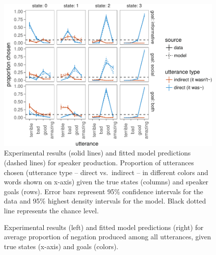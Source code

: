 \documentclass[12pt]{article}
\begin{document}
\begin{figure}
\centering
\includegraphics{fig/utterancePrediction-1.pdf}
\caption{\label{fig:utterancePrediction}Experimental results (solid lines) and fitted model predictions (dashed lines) for speaker production.
Proportion of utterances chosen (utterance type -- direct vs.~indirect -- in different colors and words shown on x-axis) given the true states (columns) and speaker goals (rows). Error bars represent 95\% confidence intervals for the data and 95\% highest density intervals for the model.
Black dotted line represents the chance level.}
\end{figure}

\begin{figure}
\centering
\caption{\label{fig:negationPrediction}Experimental results (left) and fitted model predictions (right) for average proportion of negation produced among all utterances, given true states (x-axis) and goals (colors).}
\end{figure}
\end{document}
